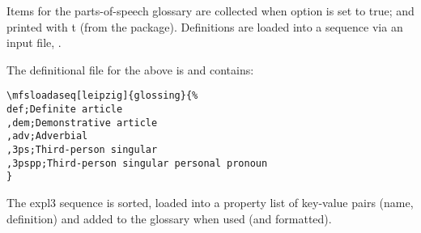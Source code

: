 \documentclass{article}
\begin{document}
\mfsformattedvboxoff




 Items for the parts-of-speech glossary are collected when  option is set to true; and printed with t (from the  package). Definitions are loaded into a sequence via an input file, .

\begin{exe}
        \ex 
{}  
\end{exe}





\begin{exe}
        \ex 
{}  
\end{exe}

\printglossaries

The definitional file for the above is  and contains:

\begin{verbatim}
\mfsloadaseq[leipzig]{glossing}{%
def;Definite article
,dem;Demonstrative article
,adv;Adverbial
,3ps;Third-person singular
,3pspp;Third-person singular personal pronoun
}
\end{verbatim}

The expl3 sequence is sorted, loaded into a property list of key-value pairs (name, definition) and added to the glossary when used (and formatted).
\end{document}
